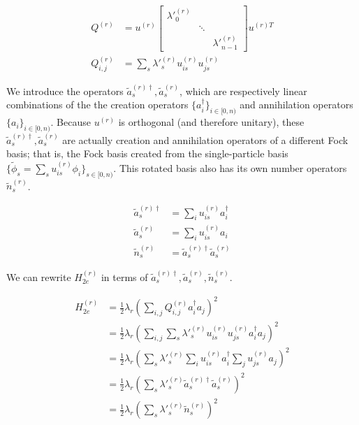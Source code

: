 \begin{equation}
    \begin{split}
        Q^{(r)} &= u^{(r)}\begin{bmatrix}
            \lambda'^{(r)}_0 & & \\ & \ddots & \\ & & \lambda'^{(r)}_{n - 1}
          \end{bmatrix}u^{(r)T} \\
        Q^{(r)}_{i, j} &= \sum_s \lambda'^{(r)}_s u^{(r)}_{is}u^{(r)}_{js}
    \end{split}
\end{equation}

We introduce the operators $\tilde{a}^{(r)\dag}_s, \tilde{a}^{(r)}_s$, which are respectively linear combinations of the the creation operators $\{a^\dag_i\}_{i \in [0, n)}$ and annihilation operators $\{a_i\}_{i \in [0, n)}$. Because $u^{(r)}$ is orthogonal (and therefore unitary), these $\tilde{a}^{(r)\dag}_s, \tilde{a}^{(r)}_s$ are actually creation and annihilation operators of a different Fock basis; that is, the Fock basis created from the single-particle basis $\{\tilde{\phi}_s = \sum_s u^{(r)}_{is} \phi_i\}_{s \in [0, n)}$. This rotated basis also has its own number operators $\tilde{n}^{(r)}_s$.

\begin{equation}
    \begin{split}
        \tilde{a}^{(r)\dag}_s &= \sum_iu^{(r)}_{is}a^\dag_i \\
        \tilde{a}^{(r)}_s &= \sum_iu^{(r)}_{is}a_i \\
        \tilde{n}^{(r)}_s &= \tilde{a}^{(r)\dag}_s\tilde{a}^{(r)}_s
    \end{split}
\end{equation}

We can rewrite $H_{2e}^{(r)}$ in terms of $\tilde{a}^{(r)\dag}_s, \tilde{a}^{(r)}_s, \tilde{n}^{(r)}_s$.

\begin{equation}
    \begin{split}
        H_{2e}^{(r)} &= \frac{1}{2}\lambda_r\left(\sum_{i,j} Q^{(r)}_{i, j}a^\dag_ia_j\right)^2 \\
        &= \frac{1}{2}\lambda_r\left(\sum_{i,j} \sum_s \lambda'^{(r)}_s u^{(r)}_{is}u^{(r)}_{js}a^\dag_ia_j\right)^2 \\
        &= \frac{1}{2}\lambda_r\left(\sum_s \lambda'^{(r)}_s \sum_i u^{(r)}_{is}a^\dag_i\sum_ju^{(r)}_{js}a_j\right)^2 \\
        &= \frac{1}{2}\lambda_r\left(\sum_s \lambda'^{(r)}_s \tilde{a}^{(r)\dag}_s\tilde{a}^{(r)}_s\right)^2 \\
        &= \frac{1}{2}\lambda_r\left(\sum_s \lambda'^{(r)}_s \tilde{n}^{(r)}_s\right)^2
    \end{split}
\end{equation}

